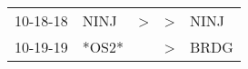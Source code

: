 \begin{supertabular}{lllll}
 10-18-18 &   NINJ &  \textgreater &  \textgreater &  NINJ \\
 10-19-19 &  *OS2* &               &  \textgreater &  BRDG \\
\end{supertabular}
